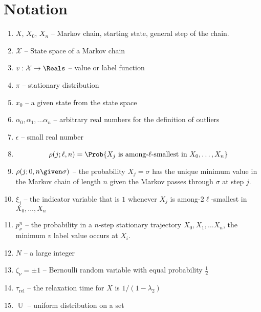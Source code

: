 \documentclass[12pt]{article}
\begin{document}
\section*{Notation}
\begin{enumerate}
    \item
        \( X \), \( X_0 \), \( X_n \) -- Markov chain, starting state,
        general step of the chain.
    \item
        \( \mathcal{X} \) -- State space of a Markov chain
    \item
        \( v :  \mathcal{X} \to \Reals \) -- value or label function
    \item
        \( \pi \) -- stationary distribution
    \item
        \( x_0 \) -- a given state from the state space
    \item
        \( \alpha_0, \alpha_1, \dots \alpha_n \) -- arbitrary real
        numbers for the definition of outliers
    \item
        \( \epsilon \) -- small real number
    \item
        \[
            \rho(j; \ell, n) = \Prob{X_j \text{ is among-\( \ell \)-smallest
            in } X_0, \dots, X_n }
        \]
    \item
        \( \rho(j; 0, n \given \sigma) \) -- the probability \( X_j =
        \sigma \) has the unique minimum value in the Markov chain of
        length \( n \) given the Markov passes through \( \sigma \) at
        step \( j \).
    \item
        \( \xi_j \) -- the indicator variable that is \( 1 \) whenever \(
        X_j \) is among-\( 2\ell \)-smallest in \( X_0, \dots , X_n \)
    \item
        \( p_{\nu}^n \) -- the probability in a \( n \)-step stationary
        trajectory \( X_0, X_1, \dots X_n \), the minimum \( v \) label
        value occurs at \( X_i \).
    \item
        \( N \) -- a large integer
    \item
        \( \zeta_{\nu} = \pm 1 \) -- Bernoulli random variable with
        equal probability \( \frac{1}{2} \)
    \item
        \( \tau_{\text{rel}} \) -- the relaxation time for \( X \) is \(
        1/ (1-\lambda_2) \)
    \item
        \(
        \operatorname{U}
        \) -- uniform distribution on a set
\end{enumerate}

\end{document}
